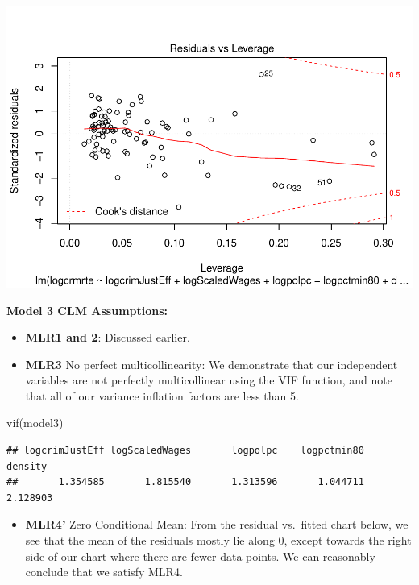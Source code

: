 \documentclass[]{article}
\newenvironment{Shaded}{}{}
\newcommand{\KeywordTok}[1]{\textcolor[rgb]{0.00,0.00,1.00}{#1}}
\newcommand{\NormalTok}[1]{#1}
\providecommand{\tightlist}{%
  \setlength{\itemsep}{0pt}\setlength{\parskip}{0pt}}
\begin{document}
\includegraphics{Bagnard_Gaustad_Hartman_Leung_Lab_3_files/figure-latex/unnamed-chunk-83-1.pdf}

\textbf{Model 3 CLM Assumptions:}

\begin{itemize}
\item
  \textbf{MLR1 and 2}: Discussed earlier.
\item
  \textbf{MLR3} No perfect multicollinearity: We demonstrate that our
  independent variables are not perfectly multicollinear using the VIF
  function, and note that all of our variance inflation factors are less
  than 5.
\end{itemize}

\begin{Shaded}
\begin{Highlighting}[]
\KeywordTok{vif}\NormalTok{(model3)}
\end{Highlighting}
\end{Shaded}

\begin{verbatim}
## logcrimJustEff logScaledWages       logpolpc    logpctmin80        density 
##       1.354585       1.815540       1.313596       1.044711       2.128903
\end{verbatim}

\begin{itemize}
\tightlist
\item
  \textbf{MLR4'} Zero Conditional Mean: From the residual vs.~fitted
  chart below, we see that the mean of the residuals mostly lie along 0,
  except towards the right side of our chart where there are fewer data
  points. We can reasonably conclude that we satisfy MLR4.
\end{itemize}
\end{document}
